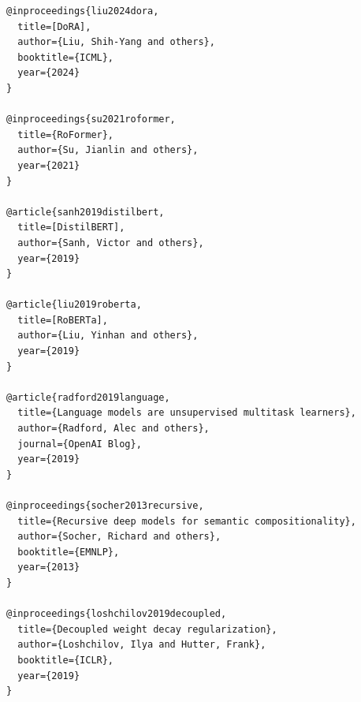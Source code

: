 \begin{lstlisting}
@inproceedings{liu2024dora,
  title=[DoRA],
  author={Liu, Shih-Yang and others},
  booktitle={ICML},
  year={2024}
}

@inproceedings{su2021roformer,
  title={RoFormer},
  author={Su, Jianlin and others},
  year={2021}
}

@article{sanh2019distilbert,
  title=[DistilBERT],
  author={Sanh, Victor and others},
  year={2019}
}

@article{liu2019roberta,
  title=[RoBERTa],
  author={Liu, Yinhan and others},
  year={2019}
}

@article{radford2019language,
  title={Language models are unsupervised multitask learners},
  author={Radford, Alec and others},
  journal={OpenAI Blog},
  year={2019}
}

@inproceedings{socher2013recursive,
  title={Recursive deep models for semantic compositionality},
  author={Socher, Richard and others},
  booktitle={EMNLP},
  year={2013}
}

@inproceedings{loshchilov2019decoupled,
  title={Decoupled weight decay regularization},
  author={Loshchilov, Ilya and Hutter, Frank},
  booktitle={ICLR},
  year={2019}
}
\end{lstlisting}

